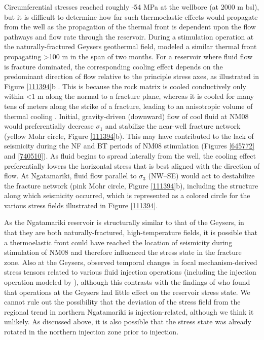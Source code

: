 Circumferential stresses reached roughly -54 MPa at the wellbore (at 2000 m bsl), but it is difficult to determine how far such thermoelastic effects would propagate from the well as the propagation of the thermal front is dependent upon the flow pathways and flow rate through the reservoir. During a stimulation operation at the naturally-fractured Geysers geothermal field, \citet{Jeanne_2015tensor} modeled a similar thermal front propagating \textgreater100 m in the span of two months. For a reservoir where fluid flow is fracture dominated, the corresponding cooling effect depends on the predominant direction of flow relative to the principle stress axes, as illustrated in Figure \ref{111394}b \citep{Jeanne_2015tensor}. This is because the rock matrix is cooled conductively only within \textless1 m along the normal to a fracture plane, whereas it is cooled for many tens of meters along the strike of a fracture, leading to an anisotropic volume of thermal cooling \citep{De_Simone_2013,Jeanne_2015tensor}. Initial, gravity-driven (downward) flow of cool fluid at NM08 would preferentially decrease $\sigma_{1}$ and stabilize the near-well fracture network (yellow Mohr circle, Figure \ref{111394}b). This may have contributed to the lack of seismicity during the NF and BT periods of NM08 stimulation (Figures \ref{645772} and \ref{740510}). As fluid begins to spread laterally from the well, the cooling effect preferentially lowers the horizontal stress that is best aligned with the direction of flow. At Ngatamariki, fluid flow parallel to $\sigma_{3}$ (NW--SE) would act to destabilize the fracture network (pink Mohr circle, Figure \ref{111394}b), including the structure along which seismicity occurred, which is represented as a colored circle for the various stress fields illustrated in Figure \ref{111394}.

As the Ngatamariki reservoir is structurally similar to that of the Geysers, in that they are both naturally-fractured, high-temperature fields, it is possible that a thermoelastic front could have reached the location of seismicity during stimulation of NM08 and therefore influenced the stress state in the fracture zone. Also at the Geysers, \citet{Mart_nez_Garz_n_2013} observed temporal changes in focal mechanism-derived stress tensors related to various fluid injection operations (including the injection operation modeled by \citet{Jeanne_2015tensor}), although this contrasts with the findings of \citet{Boyle_2014} who found that operations at the Geysers had little effect on the reservoir stress state. We cannot rule out the possibility that the deviation of the stress field from the regional trend in northern Ngatamariki is injection-related, although we think it unlikely. As discussed above, it is also possible that the stress state was already rotated in the northern injection zone prior to injection.

